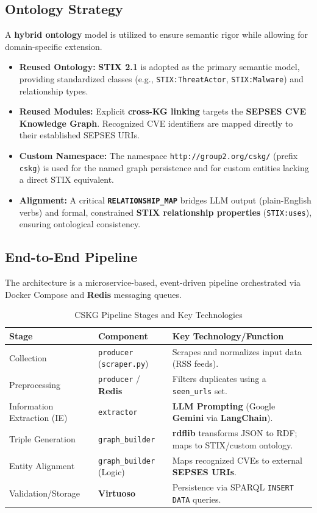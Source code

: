 \subsection{Ontology Strategy}
A \textbf{hybrid ontology} model is utilized to ensure semantic rigor while allowing for domain-specific extension.

\begin{itemize}
    \item \textbf{Reused Ontology:} \textbf{STIX 2.1} is adopted as the primary semantic model, providing standardized classes (e.g., \texttt{STIX:ThreatActor}, \texttt{STIX:Malware}) and relationship types.
    \item \textbf{Reused Modules:} Explicit \textbf{cross-KG linking} targets the \textbf{SEPSES CVE Knowledge Graph}. Recognized CVE identifiers are mapped directly to their established SEPSES URIs.
    \item \textbf{Custom Namespace:} The namespace \texttt{http://group2.org/cskg/} (prefix \texttt{cskg}) is used for the named graph persistence and for custom entities lacking a direct STIX equivalent.
    \item \textbf{Alignment:} A critical \textbf{\texttt{RELATIONSHIP\_MAP}} bridges LLM output (plain-English verbs) and formal, constrained \textbf{STIX relationship properties} (\texttt{STIX:uses}), ensuring ontological consistency.
\end{itemize}

\subsection{End-to-End Pipeline}
The architecture is a microservice-based, event-driven pipeline orchestrated via Docker Compose and \textbf{Redis} messaging queues.

\begin{table}[h]
\centering
\caption{CSKG Pipeline Stages and Key Technologies}
\label{tab:pipeline}

\begin{tabular}{l p{3cm} p{6cm}} 
\toprule
\textbf{Stage} & \textbf{Component} & \textbf{Key Technology/Function} \\
\midrule
Collection & \texttt{producer} (\texttt{scraper.py}) & Scrapes and normalizes input data (RSS feeds). \\
Preprocessing & \texttt{producer} / \textbf{Redis} & Filters duplicates using a \texttt{seen\_urls} set. \\
Information Extraction (IE) & \texttt{extractor} & \textbf{LLM Prompting} (Google \textbf{Gemini} via \textbf{LangChain}). \\
Triple Generation & \texttt{graph\_builder} & \textbf{rdflib} transforms JSON to RDF; maps to STIX/custom ontology. \\
Entity Alignment & \texttt{graph\_builder} (Logic) & Maps recognized CVEs to external \textbf{SEPSES URIs}. \\
Validation/Storage & \textbf{Virtuoso} & Persistence via SPARQL \texttt{INSERT DATA} queries. \\
\bottomrule
\end{tabular}
\end{table}
